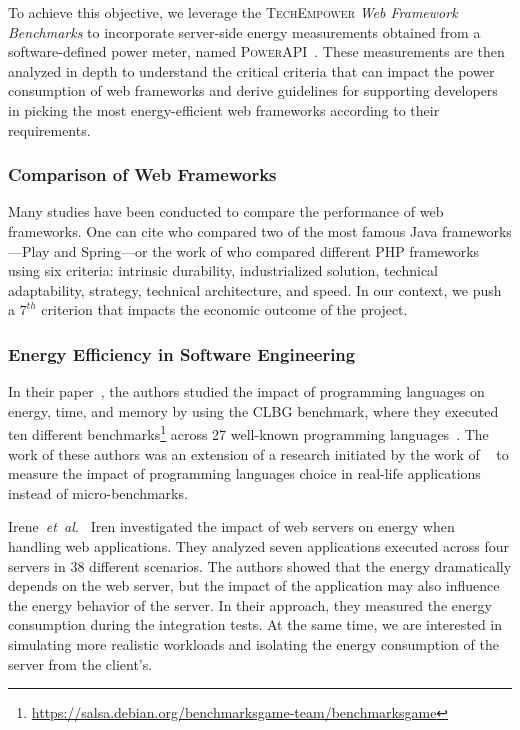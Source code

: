 To achieve this objective, we leverage the \textsc{TechEmpower} \emph{Web Framework Benchmarks} to incorporate server-side energy measurements obtained from a software-defined power meter, named \textsc{PowerAPI}~\cite{fieni2020smartwatts}.
These measurements are then analyzed in depth to understand the critical criteria that can impact the power consumption of web frameworks and derive guidelines for supporting developers in picking the most energy-efficient web frameworks according to their requirements.

\subsubsection{Comparison of Web Frameworks}
Many studies have been conducted to compare the performance of web frameworks.
One can cite \cite{gajewski_analysis_2019} who compared two of the most famous Java frameworks---Play and Spring---or the work of \cite{benmoussa_new_2019} who compared different PHP frameworks using six criteria: intrinsic durability, industrialized solution, technical adaptability, strategy, technical architecture, and speed.
In our context, we push a $7^{th}$ criterion that impacts the economic outcome of the project.

\subsubsection{Energy Efficiency in Software Engineering}

In their paper~\cite{pereira_energy_2017}, the authors studied the impact of programming languages on energy, time, and memory by using the CLBG benchmark, where they executed ten different benchmarks\footnote{\url{https://salsa.debian.org/benchmarksgame-team/benchmarksgame}} across 27 well-known programming languages~\cite{noauthor_pypl_2018}.
The work of these authors was an extension of a research initiated by the work of \citeauthor{couto2017towards}~\cite{couto2017towards} to measure the impact of programming languages choice in real-life applications instead of micro-benchmarks.

Irene~\emph{et~al.}~\cite{manotas_investigating_2013} Iren investigated the impact of web servers on energy when handling web applications.
They analyzed seven applications executed across four servers in 38 different scenarios.
The authors showed that the energy dramatically depends on the web server, but the impact of the application may also influence the energy behavior of the server.
In their approach, they measured the energy consumption during the integration tests. At the same time, we are interested in simulating more realistic workloads and isolating the energy consumption of the server from the client's.

